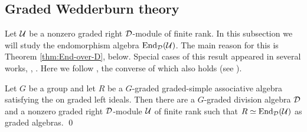 \subsection{Graded Wedderburn theory}\label{ssec:Grd-Wedderburn-Theory}

Let $\mathcal U$ be a nonzero graded right $\mathcal{D}$-module of finite rank. 
In this subsection we will study the endomorphism algebra $\operatorname{End}_{\mathcal{D}} (\mathcal U)$. 
The main reason for this is Theorem \ref{thm:End-over-D}, below. 
Special cases of this result appeared in several works, \eg, \cite{BSZ01,MR2046303,BZ02}. 
Here we follow \cite[Theorem 2.6]{livromicha}, the converse of which also holds (see \cite[page 31]{livromicha}).

\begin{thm}\label{thm:End-over-D}
    Let $G$ be a group and let $R$ be a $G$-graded graded-simple associative algebra satisfying the \dcc on graded left ideals. 
	Then there are a $G$-graded division algebra $\mathcal{D}$ and a nonzero graded right $\mathcal{D}$-module $\mathcal U$ of finite rank such that $R \simeq \operatorname{End}_{\mathcal{D}} (\mathcal U)$ as graded algebras. \qed
\end{thm}



